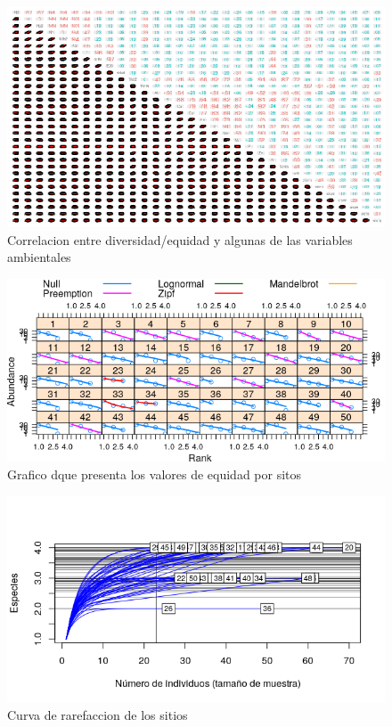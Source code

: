 \documentclass[11pt,]{article}
\begin{document}
\begin{figure}
\centering
\includegraphics[width=1.00000\textwidth]{correlacion_diversidad_equidad_actualizado.png}
\caption{Correlacion entre diversidad/equidad y algunas de las variables
ambientales \label{fig:correlacion_diversidad_equidad}}
\end{figure}

\begin{figure}
\centering
\includegraphics{grafico_niveles_equidad.png}
\caption{Grafico dque presenta los valores de equidad por sitos
\label{fig:grafico_niveles_equidad}}
\end{figure}

\begin{figure}
\centering
\includegraphics{Curva_rarefaccion.png}
\caption{Curva de rarefaccion de los sitios
\label{fig:Curva_rarefaccion}}
\end{figure}
\end{document}
